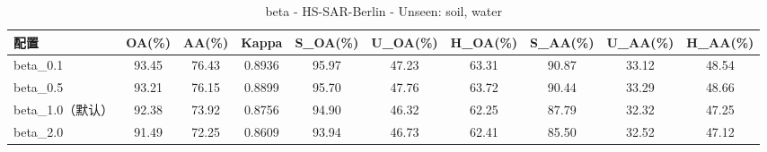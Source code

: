 \begin{table}[htbp]
\centering
\caption{beta - HS-SAR-Berlin - Unseen: soil, water}
\begin{tabular}{lccccccccc}
\hline
配置 & OA(\%) & AA(\%) & Kappa & S\_OA(\%) & U\_OA(\%) & H\_OA(\%) & S\_AA(\%) & U\_AA(\%) & H\_AA(\%) \\
\hline
beta_0.1 & 93.45 & 76.43 & 0.8936 & 95.97 & 47.23 & 63.31 & 90.87 & 33.12 & 48.54 \\
beta_0.5 & 93.21 & 76.15 & 0.8899 & 95.70 & 47.76 & 63.72 & 90.44 & 33.29 & 48.66 \\
beta_1.0（默认） & 92.38 & 73.92 & 0.8756 & 94.90 & 46.32 & 62.25 & 87.79 & 32.32 & 47.25 \\
beta_2.0 & 91.49 & 72.25 & 0.8609 & 93.94 & 46.73 & 62.41 & 85.50 & 32.52 & 47.12 \\
\hline
\end{tabular}
\end{table}